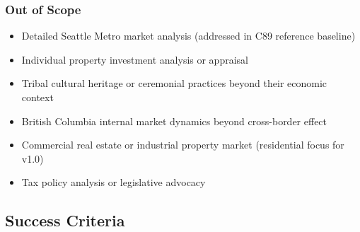 \documentclass[11pt,letterpaper]{article}
\begin{document}
\subsubsection{Out of Scope}

\begin{itemize}[leftmargin=*]
  \item Detailed Seattle Metro market analysis (addressed in C89 reference baseline)
  \item Individual property investment analysis or appraisal
  \item Tribal cultural heritage or ceremonial practices beyond their economic context
  \item British Columbia internal market dynamics beyond cross-border effect
  \item Commercial real estate or industrial property market (residential focus for v1.0)
  \item Tax policy analysis or legislative advocacy
\end{itemize}

\subsection{Success Criteria}
\end{document}

